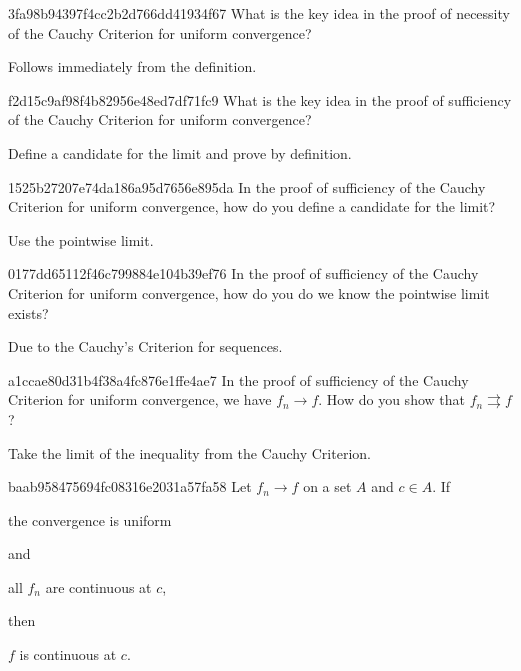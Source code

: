 \begin{note}{3fa98b94397f4cc2b2d766dd41934f67}
    What is the key idea in the proof of necessity of the Cauchy Criterion for uniform convergence?

    \begin{cloze}{1}
        Follows immediately from the definition.
    \end{cloze}
\end{note}

\begin{note}{f2d15c9af98f4b82956e48ed7df71fc9}
    What is the key idea in the proof of sufficiency of the Cauchy Criterion for uniform convergence?

    \begin{cloze}{1}
        Define a candidate for the limit and prove by definition.
    \end{cloze}
\end{note}

\begin{note}{1525b27207e74da186a95d7656e895da}
    In the proof of sufficiency of the Cauchy Criterion for uniform convergence, how do you define a candidate for the limit?

    \begin{cloze}{1}
        Use the pointwise limit.
    \end{cloze}
\end{note}

\begin{note}{0177dd65112f46c799884e104b39ef76}
    In the proof of sufficiency of the Cauchy Criterion for uniform convergence, how do you do we know the pointwise limit exists?

    \begin{cloze}{1}
        Due to the Cauchy's Criterion for sequences.
    \end{cloze}
\end{note}

\begin{note}{a1ccae80d31b4f38a4fc876e1ffe4ae7}
    In the proof of sufficiency of the Cauchy Criterion for uniform convergence, we have \({ f_n \to f }\).
    How do you show that \({ f_n \rightrightarrows f }\)?

    \begin{cloze}{1}
        Take the limit of the inequality from the Cauchy Criterion.
    \end{cloze}
\end{note}

\begin{note}{baab958475694fc08316e2031a57fa58}
    Let \({ f_n \to f }\) on a set \({ A }\) and \({ c \in A }\).
    If \begin{icloze}{3}the convergence is uniform\end{icloze} and \begin{icloze}{2}all \({ f_n }\) are continuous at \({ c }\),\end{icloze} then \begin{icloze}{1}\({ f }\) is continuous at \({ c }\).\end{icloze}
\end{note}

